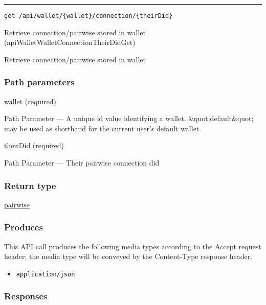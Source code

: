 \begin{center}\rule{0.5\linewidth}{\linethickness}\end{center}

\protect\hypertarget{apiWalletWalletConnectionTheirDidGet}{}{}

\begin{verbatim}
get /api/wallet/{wallet}/connection/{theirDid}
\end{verbatim}

Retrieve connection/pairwise stored in wallet
({apiWalletWalletConnectionTheirDidGet})

Retrieve connection/pairwise stored in wallet

\hypertarget{path-parameters-43}{%
\subsubsection{Path parameters}\label{path-parameters-43}}

wallet (required)

{Path Parameter} --- A unique id value identifying a wallet.
\&quot;default\&quot; may be used as shorthand for the current user's
default wallet.

theirDid (required)

{Path Parameter} --- Their pairwise connection did

\hypertarget{return-type-70}{%
\subsubsection{Return type}\label{return-type-70}}

\protect\hyperlink{pairwise}{pairwise}

\hypertarget{produces-85}{%
\subsubsection{Produces}\label{produces-85}}

This API call produces the following media types according to the
{Accept} request header; the media type will be conveyed by the
{Content-Type} response header.

\begin{itemize}
\tightlist
\item
  \texttt{application/json}
\end{itemize}

\hypertarget{responses-87}{%
\subsubsection{Responses}\label{responses-87}}

